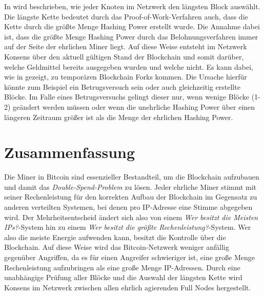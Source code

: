 \documentclass[ngerman,runningheads,a4paper]{llncs}[2018/03/10]
\begin{document}
In  wird beschrieben, wie jeder Knoten im Netzwerk den längsten Block auswählt. Die längste Kette bedeutet durch das Proof-of-Work-Verfahren auch, dass die Kette durch die größte Menge Hashing Power erstellt wurde. Die Annahme dabei ist, dass die größte Menge Hashing Power durch das Belohnungsverfahren immer auf der Seite der ehrlichen Miner liegt. Auf diese Weise entsteht im Netzwerk Konsens über den aktuell gültigen Stand der Blockchain und somit darüber, welche Geldmittel bereits ausgegeben wurden und welche nicht. Es kann dabei, wie in  gezeigt, zu temporären Blockchain Forks kommen. Die Ursache hierfür könnte zum Beispiel ein Betrugsversuch sein oder auch gleichzeitig erstellte Blöcke. Im Falle eines Betrugsversuchs gelingt dieser nur, wenn wenige Blöcke (1-2) geändert werden müssen oder wenn die unehrliche Hashing Power über einen längeren Zeitraum größer ist als die Menge der ehrlichen Hashing Power.

\section{Zusammenfassung}\label{sec:Zusammenfassung}

Die Miner in Bitcoin sind essenzieller Bestandteil, um die Blockchain aufzubauen und damit das \textit{Double-Spend-Problem} zu lösen. Jeder ehrliche Miner stimmt mit seiner Rechenleistung für den korrekten Aufbau der Blockchain im Gegensatz zu anderen verteilten Systemen, bei denen pro IP-Adresse eine Stimme abgegeben wird. Der Mehrheitsentscheid ändert sich also von einem \textit{Wer besitzt die Meisten IPs?}-System hin zu einem \textit{Wer besitzt die größte Rechenleistung?}-System. Wer also die meiste Energie aufwenden kann, besitzt die Kontrolle über die Blockchain. Auf diese Weise wird das Bitcoin-Netzwerk weniger anfällig gegenüber Angriffen, da es für einen Angreifer schwieriger ist, eine große Menge Rechenleistung aufzubringen als eine große Menge IP-Adressen. Durch eine unabhängige Prüfung aller Blöcke und die Auswahl der längsten Kette wird Konsens im Netzwerk zwischen allen ehrlich agierenden Full Nodes hergestellt.
\end{document}
